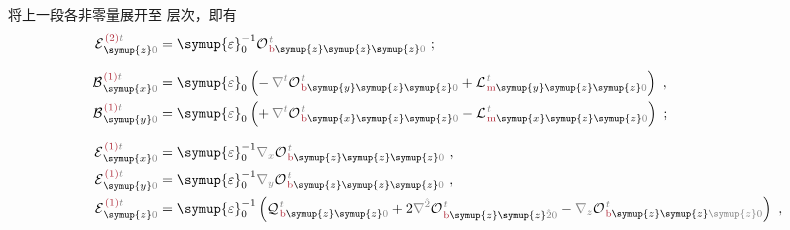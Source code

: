 将上一段各非零量展开至  层次，即有
\begin{subequations} \label{eq:EB^(2-1)_0}
\begin{align}
	{\mathcal{E}}^{\;\!\textcolor{Maroon}{(2)}\mathcolor{gray}{t}}_{\;\! \symup{z} \mathcolor{gray}{0}} &= {\symup{\varepsilon}}_0^{-1} {\mathcal{O}}^{\;\!\mathcolor{gray}{t}}_{\;\!\textcolor{Maroon}{\text{b}}\symup{z} \symup{z} \symup{z} \mathcolor{gray}{0}}~; \label{eq:E^(2)_z0} \\[0.7em]
	{\mathcal{B}}^{\;\!\textcolor{Maroon}{(1)}\mathcolor{gray}{t}}_{\;\! \symup{x} \mathcolor{gray}{0}} &= {\symup{\varepsilon}}_0 \left( -\hspace{0.2em} \mathcolor{gray}{\nabla^t}
	{\mathcal{O}}^{\;\!\mathcolor{gray}{t}}_{\;\!\textcolor{Maroon}{\text{b}}\symup{y}\symup{z}\symup{z}\mathcolor{gray}{0}} + {\mathcal{L}}^{\;\!\mathcolor{gray}{t}}_{\;\!\textcolor{Maroon}{\text{m}}\symup{y}\symup{z}\symup{z}\mathcolor{gray}{0}} \right)~, \label{eq:B^(1)_x0} \\
	{\mathcal{B}}^{\;\!\textcolor{Maroon}{(1)}\mathcolor{gray}{t}}_{\;\! \symup{y} \mathcolor{gray}{0}} &= {\symup{\varepsilon}}_0 \left( +\hspace{0.2em} \mathcolor{gray}{\nabla^t}
	{\mathcal{O}}^{\;\!\mathcolor{gray}{t}}_{\;\!\textcolor{Maroon}{\text{b}}\symup{x}\symup{z}\symup{z}\mathcolor{gray}{0}} - {\mathcal{L}}^{\;\!\mathcolor{gray}{t}}_{\;\!\textcolor{Maroon}{\text{m}}\symup{x}\symup{z}\symup{z}\mathcolor{gray}{0}} \right)~; \label{eq:B^(1)_y0} \\[0.7em]
	{\mathcal{E}}^{\;\!\textcolor{Maroon}{(1)}\mathcolor{gray}{t}}_{\;\! \symup{x} \mathcolor{gray}{0}} &= {\symup{\varepsilon}}_0^{-1} \mathcolor{gray}{\nabla_x} {\mathcal{O}}^{\;\!\mathcolor{gray}{t}}_{\;\!\textcolor{Maroon}{\text{b}}\symup{z} \symup{z} \symup{z} \mathcolor{gray}{0}}~, \label{eq:E^(1)_x0} \\
	{\mathcal{E}}^{\;\!\textcolor{Maroon}{(1)}\mathcolor{gray}{t}}_{\;\! \symup{y} \mathcolor{gray}{0}} &= {\symup{\varepsilon}}_0^{-1} \mathcolor{gray}{\nabla_y} {\mathcal{O}}^{\;\!\mathcolor{gray}{t}}_{\;\!\textcolor{Maroon}{\text{b}}\symup{z} \symup{z} \symup{z} \mathcolor{gray}{0}}~, \label{eq:E^(1)_y0} \\
	{\mathcal{E}}^{\;\!\textcolor{Maroon}{(1)}\mathcolor{gray}{t}}_{\;\! \symup{z} \mathcolor{gray}{0}} &= {\symup{\varepsilon}}_0^{-1} \left( {\mathcal{Q}}^{\;\!\mathcolor{gray}{t}}_{\;\!\textcolor{Maroon}{\text{b}}\symup{z} \symup{z} \mathcolor{gray}{0}} + 2 \mathcolor{gray}{\nabla^{\hat{2}}} {\mathcal{O}}^{\;\!\mathcolor{gray}{t}}_{\;\!\textcolor{Maroon}{\text{b}}\symup{z} \symup{z} \mathcolor{gray}{\hat{2}} \mathcolor{gray}{0}} - \mathcolor{gray}{\nabla_z} {\mathcal{O}}^{\;\!\mathcolor{gray}{t}}_{\;\!\textcolor{Maroon}{\text{b}}\symup{z} \symup{z} \mathcolor{gray}{\symup{z}} \mathcolor{gray}{0}} \right)~, \label{eq:E^(1)_z0}
\end{align}
\end{subequations}


